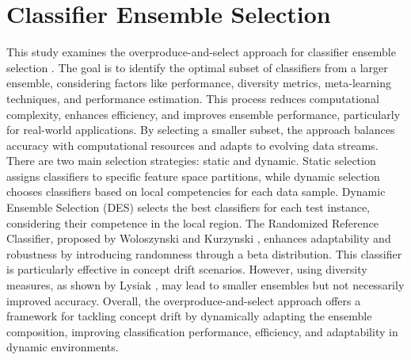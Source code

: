 %
%
\section{Classifier Ensemble Selection}

\label{sec:3_2_ensemble}
This study examines the overproduce-and-select approach for classifier ensemble selection \cite{cruz2017meta, kuncheva2000clustering, jackowski2014improved}. The goal is to identify the optimal subset of classifiers from a larger ensemble, considering factors like performance, diversity metrics, meta-learning techniques, and performance estimation. This process reduces computational complexity, enhances efficiency, and improves ensemble performance, particularly for real-world applications. By selecting a smaller subset, the approach balances accuracy with computational resources and adapts to evolving data streams. There are two main selection strategies: static and dynamic. Static selection assigns classifiers to specific feature space partitions, while dynamic selection chooses classifiers based on local competencies for each data sample. Dynamic Ensemble Selection (DES) selects the best classifiers for each test instance, considering their competence in the local region. The Randomized Reference Classifier, proposed by Woloszynski and Kurzynski \cite{woloszynski2011probabilistic}, enhances adaptability and robustness by introducing randomness through a beta distribution. This classifier is particularly effective in concept drift scenarios. However, using diversity measures, as shown by Lysiak \cite{lysiak2014optimal}, may lead to smaller ensembles but not necessarily improved accuracy. Overall, the overproduce-and-select approach offers a framework for tackling concept drift by dynamically adapting the ensemble composition, improving classification performance, efficiency, and adaptability in dynamic environments.